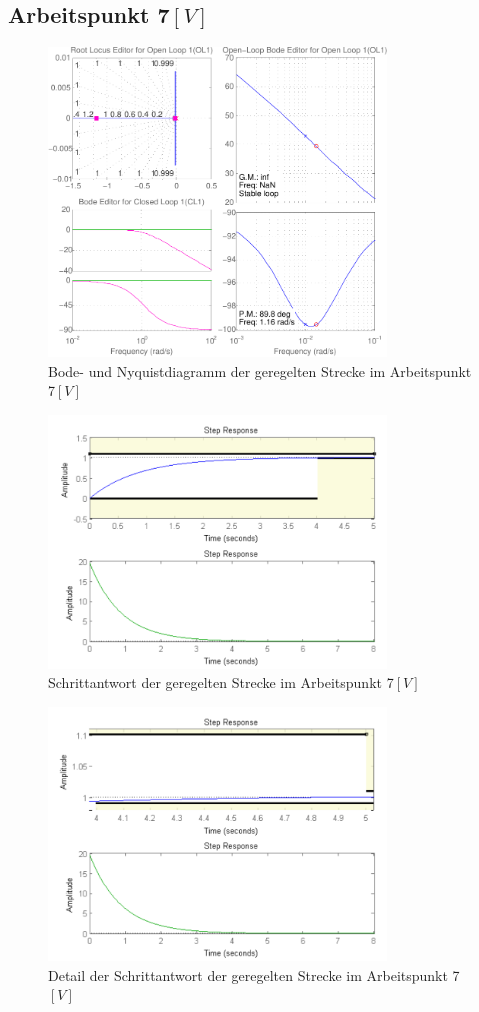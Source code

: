 \subsection{Arbeitspunkt 7$\si{[V]}$}
\begin{figure}[h!]
    \centering
    \includegraphics[width=0.8\textwidth]{10/siso_diagramms_g7.pdf}
    \caption{Bode- und Nyquistdiagramm der geregelten Strecke im Arbeitspunkt 7$\si{[V]}$}
    \label{fig:10_diag_7}
\end{figure}
\begin{figure}[h!]
    \centering
    \includegraphics[width=0.8\textwidth]{10/siso_step_g7.pdf}
    \caption{Schrittantwort der geregelten Strecke im Arbeitspunkt 7$\si{[V]}$}
    \label{fig:10_step_7}
\end{figure}
\begin{figure}[h!]
    \centering
    \includegraphics[width=0.8\textwidth]{10/siso_step_detail_g7.pdf}
    \caption{Detail der Schrittantwort der geregelten Strecke im Arbeitspunkt 7$\si{[V]}$}
    \label{fig:10_step_detail_7}
\end{figure}


